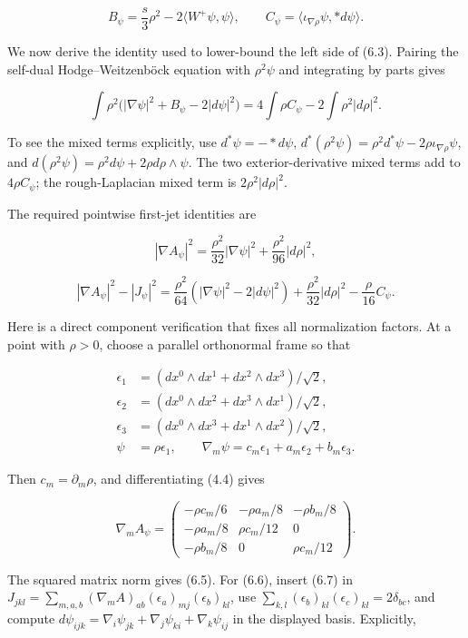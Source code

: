\documentclass[
  10pt,
]{article}
\begin{document}
\[
 B_\psi=\frac{s}{3}\rho^2-2\langle W^+\psi,\psi\rangle,
 \qquad C_\psi=\langle\iota_{\nabla\rho}\psi,*d\psi\rangle.
\]

We now derive the identity used to lower-bound the left side of (6.3).
Pairing the self-dual Hodge--Weitzenböck equation with \(\rho^2\psi\)
and integrating by parts gives

\[
 \int\rho^2\bigl(|\nabla\psi|^2+B_\psi-2|d\psi|^2\bigr)
          =4\int\rho C_\psi-2\int\rho^2|d\rho|^2.
 \tag{6.4}
\]

To see the mixed terms explicitly, use \(d^*\psi=-*d\psi\),
\(d^*(\rho^2\psi)=\rho^2d^*\psi-2\rho\iota_{\nabla\rho}\psi\), and
\(d(\rho^2\psi)=\rho^2d\psi+2\rho d\rho\wedge\psi\). The two
exterior-derivative mixed terms add to \(4\rho C_\psi\); the
rough-Laplacian mixed term is \(2\rho^2|d\rho|^2\).

The required pointwise first-jet identities are

\[
 |\nabla A_\psi|^2
       =\frac{\rho^2}{32}|\nabla\psi|^2
                                +\frac{\rho^2}{96}|d\rho|^2,
 \tag{6.5}
\]

\[
 |\nabla A_\psi|^2-|J_\psi|^2
    =\frac{\rho^2}{64}(|\nabla\psi|^2-2|d\psi|^2)
      +\frac{\rho^2}{32}|d\rho|^2-\frac\rho{16}C_\psi.
 \tag{6.6}
\]

Here is a direct component verification that fixes all normalization
factors. At a point with \(\rho>0\), choose a parallel orthonormal frame
so that

\[
 \begin{aligned}
 \epsilon_1&=(dx^0\wedge dx^1+dx^2\wedge dx^3)/\sqrt2,\\
 \epsilon_2&=(dx^0\wedge dx^2+dx^3\wedge dx^1)/\sqrt2,\\
 \epsilon_3&=(dx^0\wedge dx^3+dx^1\wedge dx^2)/\sqrt2,\\
 \psi&=\rho\epsilon_1,\qquad
 \nabla_m\psi=c_m\epsilon_1+a_m\epsilon_2+b_m\epsilon_3.
 \end{aligned}
\]

Then \(c_m=\partial_m\rho\), and differentiating (4.4) gives

\[
 \nabla_m A_\psi=
 \begin{pmatrix}
  -\rho c_m/6&-\rho a_m/8&-\rho b_m/8\\
  -\rho a_m/8&\rho c_m/12&0\\
  -\rho b_m/8&0&\rho c_m/12
 \end{pmatrix}.                                         \tag{6.7}
\]

The squared matrix norm gives (6.5). For (6.6), insert (6.7) in
\(J_{jkl}=\sum_{m,a,b}(\nabla_mA)_{ab}(\epsilon_a)_{mj}(\epsilon_b)_{kl}\),
use \(\sum_{k,l}(\epsilon_b)_{kl}(\epsilon_c)_{kl}=2\delta_{bc}\), and
compute
\(d\psi_{ijk}=\nabla_i\psi_{jk}+\nabla_j\psi_{ki} +\nabla_k\psi_{ij}\)
in the displayed basis. Explicitly,
\end{document}
